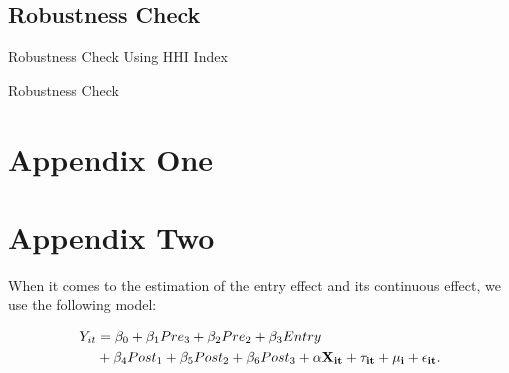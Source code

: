 
\subsection{Robustness Check} \label{subsec:robustness_check}


\begin{table}[H]
  \begin{center}
    \begin{scriptsize}
    \caption{Robustness Check Using HHI Index}
    \label{tab:sylized_fact}
      
  
    \end{scriptsize}
  \end{center}
\end{table}

\begin{table}[H]
  \begin{center}
    \begin{scriptsize}
    \caption{Robustness Check}
    \label{tab:sylized_fact}
      
  
    \end{scriptsize}
  \end{center}
\end{table}




\newpage 
\section{Appendix One \label{sec:appendix:first}}
\renewcommand{\thetable}{B\arabic{table}}
\setcounter{table}{0}
\renewcommand{\thefigure}{B\arabic{figure}}
\setcounter{figure}{0}



% 

\newpage
\section{Appendix Two
\label{sec:appendix:two}}
\renewcommand{\thetable}{C\arabic{table}}
\setcounter{table}{0}
\renewcommand{\thefigure}{C\arabic{figure}}
\setcounter{figure}{0}







When it comes to the estimation of the entry effect and its continuous effect, we use the following model:

\begin{equation}
  \begin{aligned}
    Y_{it} & = \beta_0 + \beta_1 Pre_3 + \beta_2 Pre_2 + \beta_3 Entry \\
    & + \beta_4 Post_1 + \beta_5 Post_2 + \beta_6 Post_3  + \bf{\alpha} \bf{X}_{it} + \tau_{it} + \mu_i + \epsilon_{it}.
  \end{aligned}
\end{equation}


